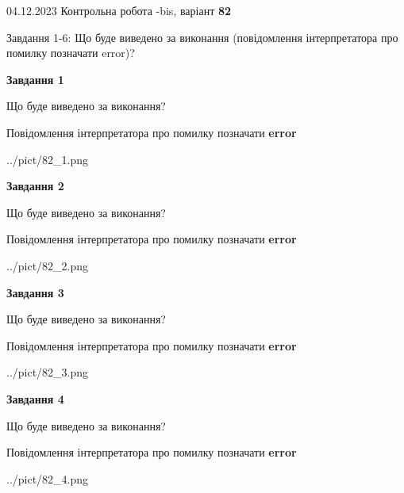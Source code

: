 \documentclass[12pt, ukrainian]{article}
\begin{document}
{{04.12.2023 Контрольна робота -bis, варіант  \No \textbf { 82 }\par}}
{

Завдання 1-6: Що буде виведено за виконання (повідомлення інтерпретатора про помилку позначати error)?


{\begin {center}\textbf{Завдання 1}\end {center}}\par
Що буде виведено за виконання? \par
Повідомлення інтерпретатора про помилку позначати \textbf{error}

\begin{center}
	{../pict/82_1.png}
\end{center}
\newpage

{\begin {center}\textbf{Завдання 2}\end {center}}\par
Що буде виведено за виконання? \par
Повідомлення інтерпретатора про помилку позначати \textbf{error}

\begin{center}
	{../pict/82_2.png}
\end{center}
\newpage

{\begin {center}\textbf{Завдання 3}\end {center}}\par
Що буде виведено за виконання? \par
Повідомлення інтерпретатора про помилку позначати \textbf{error}

\begin{center}
	{../pict/82_3.png}
\end{center}
\newpage

{\begin {center}\textbf{Завдання 4}\end {center}}\par
Що буде виведено за виконання? \par
Повідомлення інтерпретатора про помилку позначати \textbf{error}

\begin{center}
	{../pict/82_4.png}
\end{center}
\newpage

}
\end{document}
